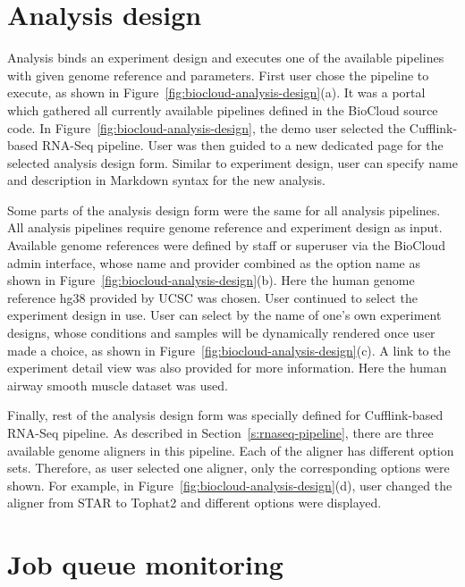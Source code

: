 \section{Analysis design}



Analysis binds an experiment design and executes one of the available pipelines
with given genome reference and parameters. First user chose the pipeline to
execute, as shown in Figure~\ref{fig:biocloud-analysis-design}(a). It was a
portal which gathered all currently available pipelines defined in the BioCloud
source code. In Figure~\ref{fig:biocloud-analysis-design}, the demo user
selected the Cufflink-based RNA-Seq pipeline. User was then guided to a new
dedicated page for the selected analysis design form. Similar to experiment
design, user can specify name and description in Markdown syntax for the
new analysis.

Some parts of the analysis design form were the same for all analysis
pipelines. All analysis pipelines require genome reference and experiment
design as input. Available genome references were defined by staff or superuser
via the BioCloud admin interface, whose name and provider combined as the
option name as shown in Figure~\ref{fig:biocloud-analysis-design}(b). Here the
human genome reference hg38 provided by UCSC was chosen. User continued to
select the experiment design in use. User can select by the name of one's own
experiment designs, whose conditions and samples will be dynamically rendered
once user made a choice, as shown in
Figure~\ref{fig:biocloud-analysis-design}(c). A link to the experiment detail
view was also provided for more information. Here the human airway smooth
muscle dataset was used.

Finally, rest of the analysis design form was specially defined for
Cufflink-based RNA-Seq pipeline. As described in
Section~\ref{s:rnaseq-pipeline}, there are three available genome aligners in
this pipeline. Each of the aligner has different option sets. Therefore, as
user selected one aligner, only the corresponding options were shown. For
example, in Figure~\ref{fig:biocloud-analysis-design}(d), user changed the
aligner from STAR to Tophat2 and different options were displayed.



\section{Job queue monitoring}

